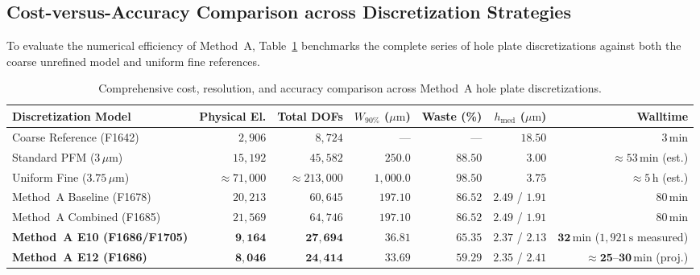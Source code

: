 \subsection{Cost-versus-Accuracy Comparison across Discretization Strategies}
\label{subsec:cost_accuracy_comparison}

To evaluate the numerical efficiency of Method~A, Table~\ref{tab:method_a_cost_accuracy_comparison} benchmarks the complete series of hole plate discretizations against both the coarse unrefined model and uniform fine references.

\begin{table}[htbp]
\centering
\footnotesize
\caption{Comprehensive cost, resolution, and accuracy comparison across Method~A hole plate discretizations.}
\label{tab:method_a_cost_accuracy_comparison}
\begin{tabularx}{\textwidth}{Xrrrrrr}
\hline
\textbf{Discretization Model} & \textbf{Physical El.} & \textbf{Total DOFs} & \textbf{$W_{90\%}$ ($\mu\mathrm{m}$)} & \textbf{Waste (\%)} & \textbf{$h_{\mathrm{med}}$ ($\mu\mathrm{m}$)} & \textbf{Walltime} \\
\hline
Coarse Reference (F1642) & $2{,}906$ & $8{,}724$ & --- & --- & $18.50$ & $3\,\mathrm{min}$ \\
Standard PFM ($3\,\mu\mathrm{m}$) & $15{,}192$ & $45{,}582$ & $250.0$ & $88.50$ & $3.00$ & $\approx 53\,\mathrm{min}$ (est.) \\
Uniform Fine ($3.75\,\mu\mathrm{m}$) & $\approx 71{,}000$ & $\approx 213{,}000$ & $1{,}000.0$ & $98.50$ & $3.75$ & $\approx 5\,\mathrm{h}$ (est.) \\
Method~A Baseline (F1678) & $20{,}213$ & $60{,}645$ & $197.10$ & $86.52$ & $2.49$ / $1.91$ & $80\,\mathrm{min}$ \\
Method~A Combined (F1685) & $21{,}569$ & $64{,}746$ & $197.10$ & $86.52$ & $2.49$ / $1.91$ & $80\,\mathrm{min}$ \\
\textbf{Method~A E10 (F1686/F1705)} & $\mathbf{9{,}164}$ & $\mathbf{27{,}694}$ & $\mathbf{36.81}$ & $\mathbf{65.35}$ & $\mathbf{2.37}$ / $\mathbf{2.13}$ & $\mathbf{32\,\mathrm{min}}$ ($1{,}921\,\mathrm{s}$ measured) \\
\textbf{Method~A E12 (F1686)} & $\mathbf{8{,}046}$ & $\mathbf{24{,}414}$ & $\mathbf{33.69}$ & $\mathbf{59.29}$ & $\mathbf{2.35}$ / $\mathbf{2.41}$ & $\mathbf{\approx 25\text{--}30\,\mathrm{min}}$ (proj.) \\
\hline
\end{tabularx}
\end{table}

